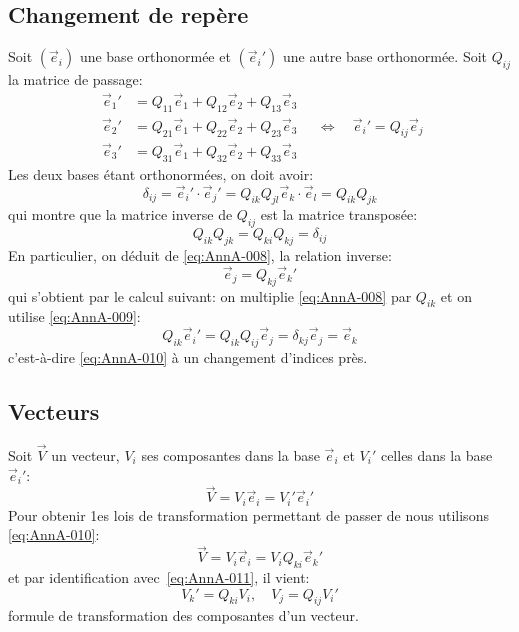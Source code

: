 \subsection{Changement de repère}
Soit $(\vec{e}_i)$ une base orthonormée et $(\vec{e}_i{}')$ une autre base orthonormée.
Soit $Q_{ij}$ la matrice de passage:
\begin{equation}
\begin{aligned}
    \vec{e}_1{}' &= Q_{11} \vec{e}_1 + Q_{12} \vec{e}_2 + Q_{13} \vec{e}_3 \\
    \vec{e}_2{}' &= Q_{21} \vec{e}_1 + Q_{22} \vec{e}_2 + Q_{23} \vec{e}_3 \\
    \vec{e}_3{}' &= Q_{31} \vec{e}_1 + Q_{32} \vec{e}_2 + Q_{33} \vec{e}_3 
\end{aligned}\quad \Leftrightarrow\quad
    \vec{e}_i{}' = Q_{ij} \vec{e}_j
    \label{eq:AnnA-008}
\end{equation}
Les deux bases étant orthonormées, on doit avoir:
\begin{equation}
    \delta_{ij} = \vec{e}_i{}' \cdot \vec{e}_j{}' = Q_{ik} Q_{jl} \vec{e}_k \cdot \vec{e}_l = Q_{ik} Q_{jk}
\end{equation}
qui montre que la matrice inverse de $Q_{ij}$ est la matrice transposée:
\begin{equation}
    Q_{ik}Q_{jk} = Q_{ki} Q_{kj} = \delta_{ij}
    \label{eq:AnnA-009}
\end{equation}
En particulier, on déduit de \eqref{eq:AnnA-008}, la relation inverse:
\begin{equation}
    \vec{e}_j = Q_{kj} \vec{e}_k{}'
    \label{eq:AnnA-010}
\end{equation}
qui s'obtient par le calcul suivant: on multiplie \eqref{eq:AnnA-008} par $Q_{ik}$ et on utilise \eqref{eq:AnnA-009}:
\begin{equation}
    Q_{ik} \vec{e}_i{}' = Q_{ik} Q_{ij} \vec{e}_j = \delta_{kj} \vec{e}_j = \vec{e}_k
\end{equation}
c'est-à-dire \eqref{eq:AnnA-010} à un changement d'indices près.
\subsection{Vecteurs}
Soit $\vec{V}$ un vecteur, $V_i$ ses composantes dans la base $\vec{e}_i$ et $V_i'$ celles dans la base $\vec{e}_i{}'$:
\begin{equation}
    \vec{V} = V_i \vec{e}_i = V_i' \vec{e}_i{}'
    \label{eq:AnnA-011}
\end{equation}
Pour obtenir 1es lois de transformation permettant de passer de nous utilisons \eqref{eq:AnnA-010}:
\begin{displaymath}
    \vec{V} = V_i \vec{e}_i = V_i Q_{ki} \vec{e}_k{}'
\end{displaymath}
et par identification avec~\eqref{eq:AnnA-011}, il vient:
\begin{equation}
    V_k' = Q_{ki} V_i, \quad V_j =  Q_{ij} V_i'
    \label{eq:AnnA-012}
\end{equation}
formule de transformation des composantes d'un vecteur.

